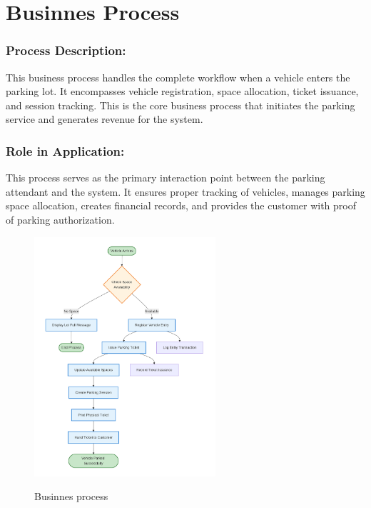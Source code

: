 \section{Businnes Process}
\subsubsection*{Process Description:}
This business process handles the complete workflow when a vehicle enters the parking lot. It encompasses vehicle registration, space allocation, ticket issuance, and session tracking. This is the core business process that initiates the parking service and generates revenue for the system.

\subsubsection*{Role in Application:}
This process serves as the primary interaction point between the parking attendant and the system. It ensures proper tracking of vehicles, manages parking space allocation, creates financial records, and provides the customer with proof of parking authorization.

\begin{figure}[h!]
    \centering
    \includegraphics[width=0.60\textwidth]{Business-Process-Documentation/Bussiness.png}
    \label{fig:businnes-process}
    \caption{Businnes process}
\end{figure}
